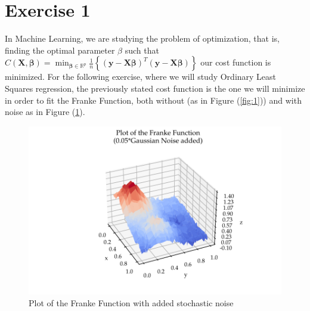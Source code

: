 \documentclass[11pt, a4paper]{article}
\begin{document}


\section*{Exercise 1}
In Machine Learning, we are studying the problem of optimization, that is, finding the optimal parameter $\beta$ such that $C(\boldsymbol{X},\boldsymbol{\beta}) = 
{\displaystyle \min_{\boldsymbol{\beta}\in {\mathbb{R}}^{p}}}\frac{1}{n}\left\{\left(\boldsymbol{y}-\boldsymbol{X}\boldsymbol{\beta}\right)^T\left(\boldsymbol{y}-\boldsymbol{X}\boldsymbol{\beta}\right)\right\}
$ our cost function is minimized. For the following exercise, where we will study Ordinary Least Squares regression, the previously stated cost function is the one we will minimize in order to fit the Franke Function, both without (as in Figure (\ref{fig:1})) and with noise as in Figure (\ref{fig:2}). 

\begin{figure}[h]
  \centering
  \includegraphics[scale=0.75]{figures/EX1_franke_function_noise_preview.pdf}
  \caption{\label{fig:2}Plot of the Franke Function with added stochastic noise}
\end{figure}
\end{document}
